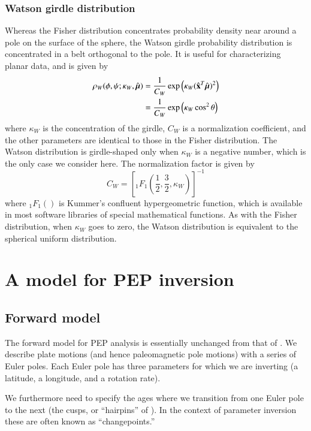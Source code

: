 \documentclass[preprint,12pt,authoryear]{elsarticle}
\newcommand{\mitbf}[1]{\hbox{\mathversion{bold}$#1$}}
\begin{document}
\subsubsection{Watson girdle distribution}
Whereas the Fisher distribution concentrates probability density near around a pole on
the surface of the sphere, the Watson girdle probability distribution is concentrated
in a belt orthogonal to the pole. It is useful for characterizing planar data, and is given by
\begin{equation}
  \begin{aligned}
  \rho_W(\phi, \psi; \kappa_W, \hat{\mitbf{\mu}}) 
  &= \frac{1}{C_W} \exp \left( \kappa_W (\hat{\mathbf{x}}^T \hat{\mitbf{\mu}})^2 \right) \\
  &= \frac{1}{C_W} \exp \left( \kappa_W \cos^2 \theta \right)
  \end{aligned}
\label{eq:watson}
\end{equation}
where $\kappa_W$ is the concentration of the girdle, $C_W$ is a normalization coefficient,
and the other parameters are identical to those in the Fisher distribution.
The Watson distribution is girdle-shaped only when $\kappa_W$ is a negative number, 
which is the only case we consider here.
The normalization factor is given by
\begin{equation}
  C_W = \left[ {}_1 F_1 \left( \frac{1}{2}, \frac{3}{2}, \kappa_W \right) \right]^{-1}
\end{equation}
where ${}_1 F_1()$ is Kummer's confluent hypergeometric function, which is available
in most software libraries of special mathematical functions.
As with the Fisher distribution, when $\kappa_W$ goes to zero, 
the Watson distribution is equivalent to the spherical uniform distribution.

\section{A model for PEP inversion}
\label{sec:model}
\subsection{Forward model}
\label{sec:forward_model}
The forward model for PEP analysis is essentially unchanged from that of \citet{gordon1984paleomagnetic}.
We describe plate motions (and hence paleomagnetic pole motions) with a series of Euler poles.
Each Euler pole has three parameters for which we are inverting (a latitude, a longitude, and a rotation rate).

We furthermore need to specify the ages where we transition from 
one Euler pole to the next (the cusps, or ``hairpins'' of \citet{irving1972hairpins}).
In the context of parameter inversion these are often known as ``changepoints.''
\end{document}

